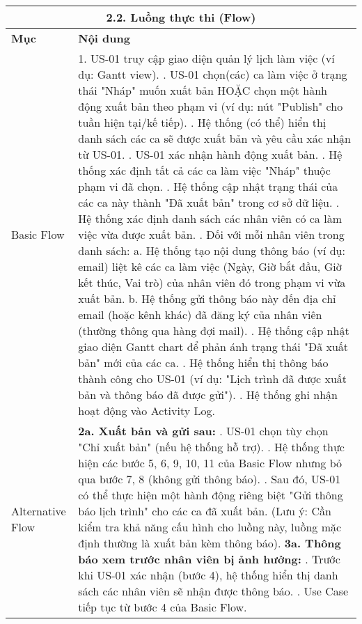 \begin{longtable}{|m{4cm}|p{11cm}|}
\hline
\multicolumn{2}{|c|}{\textbf{2.2. Luồng thực thi (Flow)}} \\
\hline
\textbf{Mục} & \textbf{Nội dung} \\
\hline
Basic Flow & 1. US-01 truy cập giao diện quản lý lịch làm việc (ví dụ: Gantt view). \newline 2. US-01 chọn(các) ca làm việc ở trạng thái "Nháp" muốn xuất bản HOẶC chọn một hành động xuất bản theo phạm vi (ví dụ: nút "Publish" cho tuần hiện tại/kế tiếp). \newline 3. Hệ thống (có thể) hiển thị danh sách các ca sẽ được xuất bản và yêu cầu xác nhận từ US-01. \newline 4. US-01 xác nhận hành động xuất bản. \newline 5. Hệ thống xác định tất cả các ca làm việc "Nháp" thuộc phạm vi đã chọn. \newline 6. Hệ thống cập nhật trạng thái của các ca này thành "Đã xuất bản" trong cơ sở dữ liệu. \newline 7. Hệ thống xác định danh sách các nhân viên có ca làm việc vừa được xuất bản. \newline 8. Đối với mỗi nhân viên trong danh sách: \newline    a. Hệ thống tạo nội dung thông báo (ví dụ: email) liệt kê các ca làm việc (Ngày, Giờ bắt đầu, Giờ kết thúc, Vai trò) của nhân viên đó trong phạm vi vừa xuất bản. \newline    b. Hệ thống gửi thông báo này đến địa chỉ email (hoặc kênh khác) đã đăng ký của nhân viên (thường thông qua hàng đợi mail). \newline 9. Hệ thống cập nhật giao diện Gantt chart để phản ánh trạng thái "Đã xuất bản" mới của các ca. \newline 10. Hệ thống hiển thị thông báo thành công cho US-01 (ví dụ: "Lịch trình đã được xuất bản và thông báo đã được gửi"). \newline 11. Hệ thống ghi nhận hoạt động vào Activity Log. \\
\hline
Alternative Flow & \textbf{2a. Xuất bản và gửi sau:} \newline    1. US-01 chọn tùy chọn "Chỉ xuất bản" (nếu hệ thống hỗ trợ). \newline    2. Hệ thống thực hiện các bước 5, 6, 9, 10, 11 của Basic Flow nhưng bỏ qua bước 7, 8 (không gửi thông báo). \newline    3. Sau đó, US-01 có thể thực hiện một hành động riêng biệt "Gửi thông báo lịch trình" cho các ca đã xuất bản. \newline (Lưu ý: Cần kiểm tra khả năng cấu hình cho luồng này, luồng mặc định thường là xuất bản kèm thông báo). \newline \textbf{3a. Thông báo xem trước nhân viên bị ảnh hưởng:} \newline    1. Trước khi US-01 xác nhận (bước 4), hệ thống hiển thị danh sách các nhân viên sẽ nhận được thông báo. \newline    2. Use Case tiếp tục từ bước 4 của Basic Flow. \\

\end{longtable}
